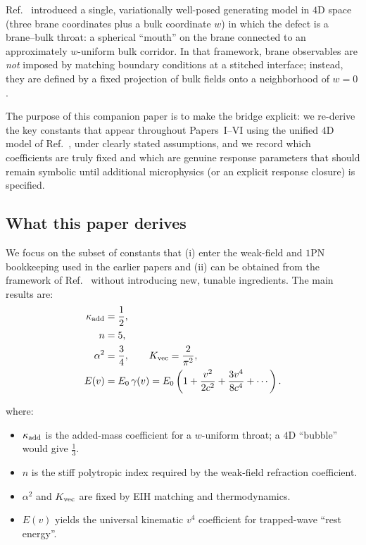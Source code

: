 \documentclass[11pt]{article}
\begin{document}
Ref.~\cite{norris2026_4d_model} introduced a single, variationally well-posed generating model in $4$D space (three
brane coordinates plus a bulk coordinate $w$) in which the defect is a brane--bulk throat: a
spherical ``mouth'' on the brane connected to an approximately $w$-uniform bulk corridor. In that
framework, brane observables are \emph{not} imposed by matching boundary conditions at a stitched
interface; instead, they are defined by a fixed projection of bulk fields onto a neighborhood of
$w=0$.

The purpose of this companion paper is to make the bridge explicit: we re-derive the key constants
that appear throughout Papers~I--VI using the unified $4$D model of Ref.~\cite{norris2026_4d_model}, under clearly stated
assumptions, and we record which coefficients are truly fixed and which are genuine response
parameters that should remain symbolic until additional microphysics (or an explicit response
closure) is specified.

\subsection{What this paper derives}

We focus on the subset of constants that (i) enter the weak-field and $1$PN bookkeeping used in
the earlier papers and (ii) can be obtained from the framework of Ref.~\cite{norris2026_4d_model} without introducing new,
tunable ingredients. The main results are:
\begin{align}
\kappa_{\rm add} &= \frac12,\\
n &= 5,\\
\alpha^2 &= \frac34,\qquad K_{\rm vec} = \frac{2}{\pi^2},\\
E(v) &= E_0\,\gamma(v)
= E_0\left(1+\frac{v^2}{2c^2}+\frac{3v^4}{8c^4}+\cdots\right).
\end{align}

\noindent where:
\begin{itemize}
\item $\kappa_{\rm add}$ is the added-mass coefficient for a $w$-uniform throat; a $4$D ``bubble'' would give $\tfrac13$.
\item $n$ is the stiff polytropic index required by the weak-field refraction coefficient.
\item $\alpha^2$ and $K_{\rm vec}$ are fixed by EIH matching and thermodynamics.
\item $E(v)$ yields the universal kinematic $v^4$ coefficient for trapped-wave ``rest energy''.
\end{itemize}
\end{document}
